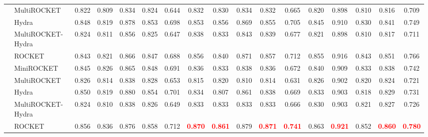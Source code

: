 \begin{table}[tbp]
{\begin{tabular}{llccccc|ccccc|ccccc}
              & MultiROCKET
              & 0.822 & 0.809 & 0.834 & 0.824 & 0.644  
              & 0.832 & 0.830 & 0.834 & 0.832 & 0.665  
              & 0.820 & 0.898 & 0.810 & 0.816 & 0.709 \\
              & Hydra
              & 0.848 & 0.819 & 0.878 & 0.853 & 0.698  
              & 0.853 & 0.856 & 0.869 & 0.855 & 0.705  
              & 0.845 & 0.910 & 0.830 & 0.841 & 0.749 \\
              & MultiROCKET-Hydra
              & 0.824 & 0.811 & 0.856 & 0.825 & 0.647  
              & 0.838 & 0.833 & 0.843 & 0.839 & 0.677  
              & 0.821 & 0.898 & 0.810 & 0.817 & 0.711 \\
\midrule
{} 
              & ROCKET  
              & 0.843 & 0.821 & 0.866 & 0.847 & 0.688  
              & 0.856 & 0.840 & 0.871 & 0.857 & 0.712  
              & 0.855 & 0.916 & 0.843 & 0.851 & 0.766 \\
              & MiniROCKET 
              & 0.845 & 0.826 & 0.865 & 0.848 & 0.691  
              & 0.836 & 0.833 & 0.838 & 0.836 & 0.672  
              & 0.840 & 0.909 & 0.833 & 0.838 & 0.742 \\
              & MultiROCKET
              & 0.826 & 0.814 & 0.838 & 0.828 & 0.653  
              & 0.815 & 0.820 & 0.810 & 0.814 & 0.631  
              & 0.826 & 0.902 & 0.820 & 0.824 & 0.721 \\
              & Hydra
              & 0.850 & 0.819 & 0.880 & 0.854 & 0.701  
              & 0.834 & 0.807 & 0.861 & 0.838 & 0.669  
              & 0.833 & 0.903 & 0.818 & 0.829 & 0.731 \\
              & MultiROCKET-Hydra
              & 0.824 & 0.810 & 0.838 & 0.826 & 0.649  
              & 0.833 & 0.833 & 0.833 & 0.833 & 0.666  
              & 0.830 & 0.903 & 0.821 & 0.827 & 0.726 \\
\midrule
{} 
              & ROCKET  
              & 0.856 & 0.836 & 0.876 & 0.858 & 0.712  
              & \textcolor{red}{\textbf{0.870}} & \textcolor{red}{\textbf{0.861}} & 0.879 & \textcolor{red}{\textbf{0.871}} & \textcolor{red}{\textbf{0.741}}  
              & 0.863 & \textcolor{red}{\textbf{0.921}} & 0.852 & \textcolor{red}{\textbf{0.860}} & \textcolor{red}{\textbf{0.780}} \\

\end{tabular}}
\end{table}

